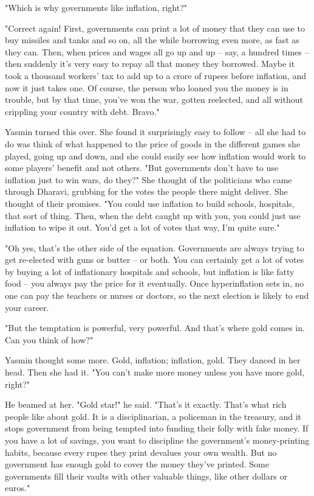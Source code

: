 "Which is why governments like inflation, right?"

"Correct again! First, governments can print a lot of money that
they can use to buy missiles and tanks and so on, all the while
borrowing even more, as fast as they can. Then, when prices and
wages all go up and up -- say, a hundred times -- then suddenly
it's very easy to repay all that money they borrowed. Maybe it took
a thousand workers' tax to add up to a crore of rupees before
inflation, and now it just takes one. Of course, the person who
loaned you the money is in trouble, but by that time, you've won
the war, gotten reelected, and all without crippling your country
with debt. Bravo."

Yasmin turned this over. She found it surprisingly easy to follow
-- all she had to do was think of what happened to the price of
goods in the different games she played, going up and down, and she
could easily see how inflation would work to some players' benefit
and not others. "But governments don't have to use inflation just
to win wars, do they?" She thought of the politicians who came
through Dharavi, grubbing for the votes the people there might
deliver. She thought of their promises. "You could use inflation to
build schools, hospitals, that sort of thing. Then, when the debt
caught up with you, you could just use inflation to wipe it out.
You'd get a lot of votes that way, I'm quite sure."

"Oh yes, that's the other side of the equation. Governments are
always trying to get re-elected with guns or butter -- or both. You
can certainly get a lot of votes by buying a lot of inflationary
hospitals and schools, but inflation is like fatty food -- you
always pay the price for it eventually. Once hyperinflation sets
in, no one can pay the teachers or nurses or doctors, so the next
election is likely to end your career.

"But the temptation is powerful, very powerful. And that's where
gold comes in. Can you think of how?"

Yasmin thought some more. Gold, inflation; inflation, gold. They
danced in her head. Then she had it. "You can't make more money
unless you have more gold, right?"

He beamed at her. "Gold star!" he said. "That's it exactly. That's
what rich people like about gold. It is a disciplinarian, a
policeman in the treasury, and it stops government from being
tempted into funding their folly with fake money. If you have a lot
of savings, you want to discipline the government's money-printing
habits, because every rupee they print devalues your own wealth.
But no government has enough gold to cover the money they've
printed. Some governments fill their vaults with other valuable
things, like other dollars or euros."

